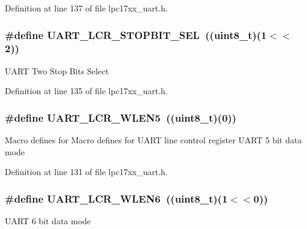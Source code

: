 \-Definition at line 137 of file lpc17xx\-\_\-uart.\-h.

\hypertarget{group___u_a_r_t___private___macros_gae18d2dcf0d93727fc4ac3fae1960b1df}{
\subsubsection[{\-U\-A\-R\-T\-\_\-\-L\-C\-R\-\_\-\-S\-T\-O\-P\-B\-I\-T\-\_\-\-S\-E\-L}]{\setlength{\rightskip}{0pt plus 5cm}\#define {\bf \-U\-A\-R\-T\-\_\-\-L\-C\-R\-\_\-\-S\-T\-O\-P\-B\-I\-T\-\_\-\-S\-E\-L}~((uint8\-\_\-t)(1$<$$<$2))}}\label{group___u_a_r_t___private___macros_gae18d2dcf0d93727fc4ac3fae1960b1df}
\-U\-A\-R\-T \-Two \-Stop \-Bits \-Select 

\-Definition at line 135 of file lpc17xx\-\_\-uart.\-h.

\hypertarget{group___u_a_r_t___private___macros_ga2c64fd92092b8ac1e64b6b1204927682}{
\subsubsection[{\-U\-A\-R\-T\-\_\-\-L\-C\-R\-\_\-\-W\-L\-E\-N5}]{\setlength{\rightskip}{0pt plus 5cm}\#define {\bf \-U\-A\-R\-T\-\_\-\-L\-C\-R\-\_\-\-W\-L\-E\-N5}~((uint8\-\_\-t)(0))}}\label{group___u_a_r_t___private___macros_ga2c64fd92092b8ac1e64b6b1204927682}
\-Macro defines for \-Macro defines for \-U\-A\-R\-T line control register \-U\-A\-R\-T 5 bit data mode 

\-Definition at line 131 of file lpc17xx\-\_\-uart.\-h.

\hypertarget{group___u_a_r_t___private___macros_ga916fcefe6db8651be1cb1c066726381d}{
\subsubsection[{\-U\-A\-R\-T\-\_\-\-L\-C\-R\-\_\-\-W\-L\-E\-N6}]{\setlength{\rightskip}{0pt plus 5cm}\#define {\bf \-U\-A\-R\-T\-\_\-\-L\-C\-R\-\_\-\-W\-L\-E\-N6}~((uint8\-\_\-t)(1$<$$<$0))}}\label{group___u_a_r_t___private___macros_ga916fcefe6db8651be1cb1c066726381d}
\-U\-A\-R\-T 6 bit data mode 


